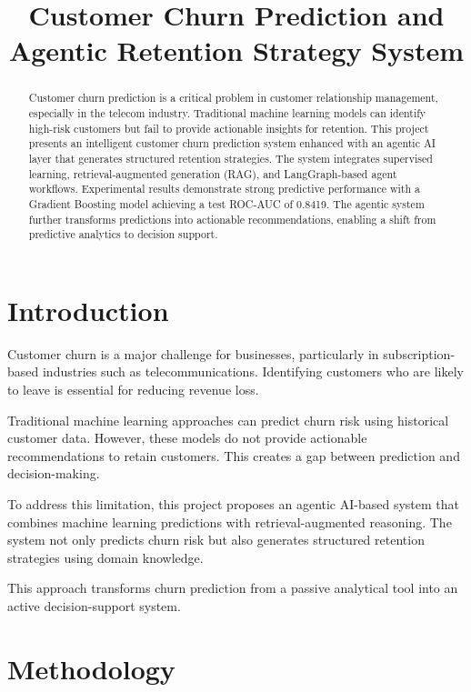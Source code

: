 \documentclass[conference]{IEEEtran}
\title{Customer Churn Prediction and Agentic Retention Strategy System}
\author{
\IEEEauthorblockN{Harshit Jain, Vansh Dagar, Anishka Khurana}
\IEEEauthorblockA{Introduction to AI/ML \\ 4th Semester}
}
\begin{document}
\maketitle

\begin{abstract}
Customer churn prediction is a critical problem in customer relationship management, especially in the telecom industry. Traditional machine learning models can identify high-risk customers but fail to provide actionable insights for retention. This project presents an intelligent customer churn prediction system enhanced with an agentic AI layer that generates structured retention strategies. The system integrates supervised learning, retrieval-augmented generation (RAG), and LangGraph-based agent workflows. Experimental results demonstrate strong predictive performance with a Gradient Boosting model achieving a test ROC-AUC of 0.8419. The agentic system further transforms predictions into actionable recommendations, enabling a shift from predictive analytics to decision support.
\end{abstract}

\section{Introduction}

Customer churn is a major challenge for businesses, particularly in subscription-based industries such as telecommunications. Identifying customers who are likely to leave is essential for reducing revenue loss.

Traditional machine learning approaches can predict churn risk using historical customer data. However, these models do not provide actionable recommendations to retain customers. This creates a gap between prediction and decision-making.

To address this limitation, this project proposes an agentic AI-based system that combines machine learning predictions with retrieval-augmented reasoning. The system not only predicts churn risk but also generates structured retention strategies using domain knowledge.

This approach transforms churn prediction from a passive analytical tool into an active decision-support system.

\section{Methodology}
\end{document}
